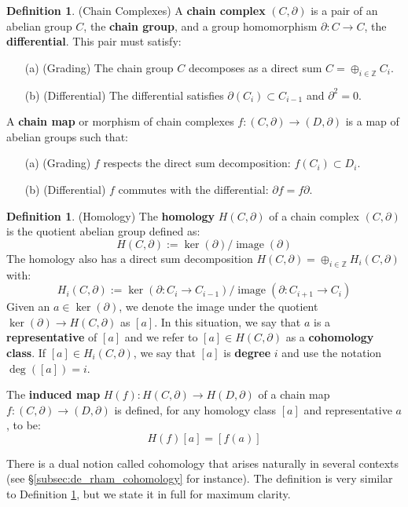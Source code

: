 \documentclass[12pt]{article}
\theoremstyle{definition}
\newtheorem{definition}[theorem]{Definition}
\numberwithin{equation}{section}
\newcommand{\Z}{{\mathbb Z}}
\newcommand{\op}{\operatorname}
\begin{document}
\begin{definition} \label{def:chain_complexes} (Chain Complexes) A {\bf chain complex} $(C,\partial)$ is a pair of an abelian group $C$, the {\bf chain group}, and a group homomorphism $\partial:C \to C$, the {\bf differential}. This pair must satisfy:
\begin{itemize}
\item[(a)] (Grading) The chain group $C$ decomposes as a direct sum $C = \oplus_{i \in \Z} C_i$.
\item[(b)] (Differential) The differential satisfies $\partial(C_i) \subset C_{i-1}$ and $\partial^2 = 0$.
\end{itemize}
A {\bf chain map} or morphism of chain complexes $f:(C,\partial) \to (D,\partial)$ is a map of abelian groups such that:
\begin{itemize}
\item[(a)] (Grading) $f$ respects the direct sum decomposition: $f(C_i) \subset D_i$.
\item[(b)] (Differential) $f$ commutes with the differential: $\partial f = f \partial$.
\end{itemize}
\end{definition}

\begin{definition} \label{def:homology} (Homology) The {\bf homology} $H(C,\partial)$ of a chain complex $(C,\partial)$ is the quotient abelian group defined as:
\[
H(C,\partial) := \op{ker}(\partial)/\op{image}(\partial)
\]
The homology also has a direct sum decomposition $H(C,\partial) = \oplus_{i \in \Z} H_i(C,\partial)$ with:
\[
H_i(C,\partial) := \op{ker}(\partial:C_i \to C_{i-1})/\op{image}(\partial:C_{i+1} \to C_i)
\]
Given an $a \in \op{ker}(\partial)$, we denote the image under the quotient $\op{ker}(\partial) \to H(C,\partial)$ as $[a]$. In this situation, we say that $a$ is a {\bf representative} of $[a]$ and we refer to $[a] \in H(C,\partial)$ as a {\bf cohomology class}. If $[a] \in H_i(C,\partial)$, we say that $[a]$ is {\bf degree} $i$ and use the notation $\op{deg}([a]) = i$. 

The {\bf induced map} $H(f):H(C,\partial) \to H(D,\partial)$ of a chain map $f:(C,\partial) \to (D,\partial)$ is defined, for any homology class $[a]$ and representative $a$, to be:
\[
H(f)[a] = [f(a)]
\]
\end{definition}

There is a dual notion called cohomology that arises naturally in several contexts (see \S \ref{subsec:de_rham_cohomology} for instance). The definition is very similar to Definition \ref{def:homology}, but we state it in full for maximum clarity.
\end{document}
